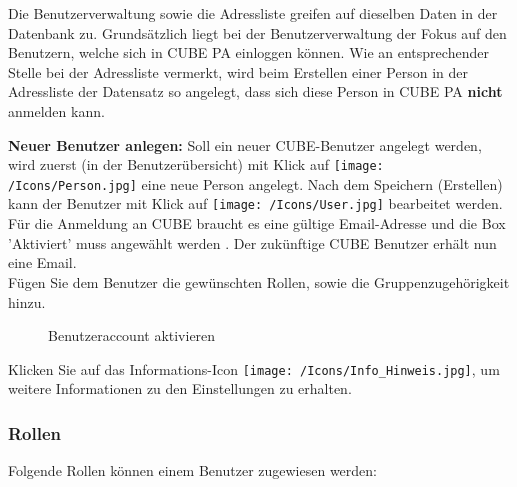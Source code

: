 Die Benutzerverwaltung sowie die Adressliste greifen auf dieselben Daten in der Datenbank zu. Grundsätzlich liegt bei der Benutzerverwaltung der Fokus auf den Benutzern, welche sich in CUBE PA einloggen können. Wie an entsprechender Stelle bei der Adressliste vermerkt, wird beim Erstellen einer Person in der Adressliste der Datensatz so angelegt, dass sich diese Person in CUBE PA \textbf{nicht} anmelden kann. 

\vspace{\baselineskip}

\textbf{Neuer Benutzer anlegen:} Soll ein neuer CUBE-Benutzer angelegt werden, wird zuerst (in der Benutzerübersicht) mit Klick auf \texttt{[image: /Icons/Person.jpg]} eine neue Person angelegt. Nach dem Speichern (Erstellen) kann der Benutzer mit Klick auf \texttt{[image: /Icons/User.jpg]} bearbeitet werden. Für die Anmeldung an CUBE braucht es eine gültige Email-Adresse und die Box 'Aktiviert' muss angewählt werden . Der zukünftige CUBE Benutzer erhält nun eine Email.\\
Fügen Sie dem Benutzer die gewünschten Rollen, sowie die Gruppenzugehörigkeit hinzu.

\begin{figure}[H]
\caption{Benutzeraccount aktivieren}
\end{figure}

Klicken Sie auf das Informations-Icon \texttt{[image: /Icons/Info\_Hinweis.jpg]}, um weitere Informationen zu den Einstellungen zu erhalten.

\vspace{-10pt}

\subsubsection{Rollen}
\label{bkm:Ref445361985}

Folgende Rollen können einem Benutzer zugewiesen werden:

